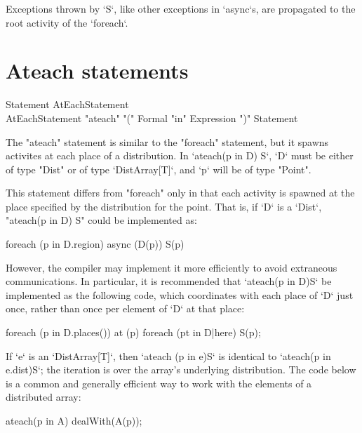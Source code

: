 Exceptions thrown by \xcd`S`, like other exceptions in \xcd`async`s, are
propagated to the root activity of the \xcd`foreach`.  



\section{Ateach statements}\label{ateach-section}

\begin{grammar}
Statement \: AtEachStatement \\
AtEachStatement \:
      \xcd"ateach" \xcd"(" Formal \xcd"in" Expression \xcd")"
         Statement 
\end{grammar}

The \xcd"ateach" statement is similar to the \xcd"foreach"
statement, but it spawns activites at each place of a distribution. 
In \xcd`ateach(p in D) S`, 
\xcd`D` must be either of type \xcd"Dist" or of type
\xcd`DistArray[T]`, 
and \xcd`p` will be of type \xcd"Point".

This statement differs from \xcd"foreach" only in
that each activity is spawned at the place specified by the
distribution for the point. That is, if \xcd`D` is a \xcd`Dist`, 
\xcd"ateach(p in D) S" could be implemented as:
\begin{xten}
foreach (p in D.region) 
  async (D(p)) S(p)
\end{xten}

However, the compiler may implement it more efficiently to avoid extraneous
communications.  In particular, it is recommended that \xcd`ateach(p in D)S`
be implemented as the following code, which coordinates with each place of
\xcd`D` just once, rather than once per element of \xcd`D` at that place: 

\begin{xten}
foreach (p in D.places()) at (p) {
    foreach (pt in D|here) {
        S(p);
    }
}
\end{xten}

If \xcd`e` is an \xcd`DistArray[T]`, then \xcd`ateach (p in e)S` is identical to
\xcd`ateach(p in e.dist)S`; the iteration is over the array's underlying
distribution.   
The code below is a common and generally efficient way to work with the
elements of a distributed array:
\begin{xten}
ateach(p in A) 
  dealWith(A(p));
\end{xten}




